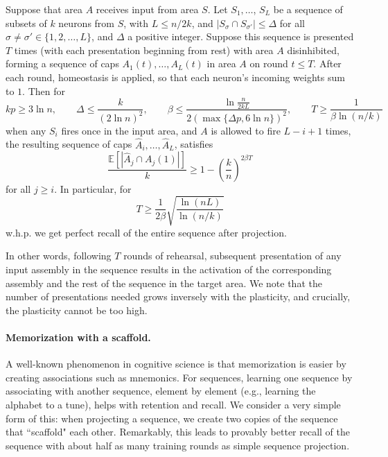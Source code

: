 \documentclass[12pt,nosubfloats]{alt2024} %
\newcommand{\E}{\mathbb{E}}
\newcommand{\1}{\mathbbm{1}}
\begin{document}
\begin{theorem} \label{thm:simple}
Suppose that area $A$ receives input from area $S$. Let $S_1,\ldots$, $S_L$ be a sequence of subsets of $k$ neurons from $S$, with $L \le n / 2k$, and $|S_{\sigma} \cap S_{\sigma'}| \le \Delta$ for all $\sigma \neq \sigma' \in \{1,2,\ldots,L\}$, and $\Delta$ a positive integer. Suppose this sequence is presented $T$ times (with each presentation beginning from rest) with area $A$ disinhibited, forming a sequence of caps $A_1(t), \ldots, A_L(t)$ in area $A$ on round $t \le T$. After each round, homeostasis is applied, so that each neuron's incoming weights sum to $1$. Then for 
\[
kp \ge 3 \ln n, \qquad \Delta \le \frac{k}{(2\ln n)^2}, \qquad \beta \le \frac{ \ln \frac{n}{2kL}}{2 (\max \{\Delta p, 6 \ln n\})^2 }, \qquad 
T \ge \frac{1}{\beta \ln (n/k)}
\]
when any $S_i$ fires once in the input area, and $A$ is allowed to fire $L-i+1$ times, the resulting sequence of caps $\widehat A_i, \ldots, \widehat A_L$, satisfies
\[\frac{\E[|\widehat A_j \cap A_j(1)|]}{k} \ge 1 - \left(\frac{k}{n}\right)^{2 \beta T}\]
for all $j \ge i$. In particular, for 
\[T  \ge \frac{1}{2\beta}\sqrt{\frac{\ln(nL)}{\ln (n/k)}}\]
w.h.p. we get perfect recall of the entire sequence after projection.
\end{theorem}

In other words, following $T$ rounds of rehearsal, subsequent presentation of any input assembly in the sequence results in the activation of the corresponding assembly and the rest of the sequence in the target area. We note that the number of presentations needed grows inversely with the plasticity, and crucially, the plasticity cannot be too high.

\paragraph{Memorization with a scaffold.} A well-known phenomenon in cognitive science is that memorization is easier by creating associations such as mnemonics. For sequences, learning one sequence by associating with another sequence, element by element (e.g., learning the alphabet to a tune), helps with retention and recall. We consider a very simple form of this: when projecting a sequence, we create two copies of the sequence that ``scaffold" each other. Remarkably, this leads to provably better recall of the sequence with about half as many training rounds as simple sequence projection. 
\end{document}

